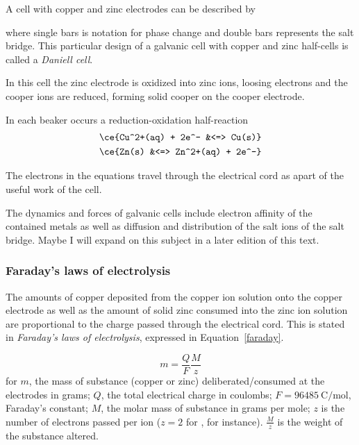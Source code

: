 \documentclass[../mit-general-chemistry.tex]{subfiles}
\begin{document}
A cell with copper and zinc electrodes can be described by


where single bars is notation for phase change and double bars
represents the salt bridge. This particular design of a galvanic cell
with copper and zinc half-cells is called a {\em Daniell cell}.

In this cell the zinc electrode is oxidized into zinc ions, loosing
electrons and the cooper ions are reduced, forming solid cooper on the
cooper electrode.

In each beaker occurs a reduction-oxidation half-reaction
\begin{align*}
  \ce{Cu^2+(aq) + 2e^- &<=> Cu(s)} \\
  \ce{Zn(s) &<=> Zn^2+(aq) + 2e^-} \\
\end{align*}

The electrons in the equations travel through the electrical cord as
apart of the useful work of the cell.

The dynamics and forces of galvanic cells include electron affinity of
the contained metals as well as diffusion and distribution of the
salt ions of the salt bridge. Maybe I will expand on this subject in a
later edition of this text.







\subsubsection{Faraday's laws of electrolysis}

The amounts of copper deposited from the copper ion solution onto the
copper electrode as well as the amount of solid zinc consumed into the
zinc ion solution are proportional to the charge passed through the
electrical cord. This is stated in {\em Faraday's laws of
  electrolysis}, expressed in Equation~\ref{faraday}.

\begin{equation}\label{faraday}
  m = \frac{Q}{F}\frac{M}{z}
\end{equation}
for $m$, the mass of substance (copper or zinc) deliberated/consumed
at the electrodes in grams; $Q$, the total electrical charge in
coulombs; $F = \SI{96485}{\coulomb\per\mol}$, Faraday's constant; $M$,
the molar mass of substance in grams per mole; $z$ is the number of
electrons passed per ion ($z = 2$ for , for
instance). $\frac{M}{z}$ is the weight of the substance altered.
\end{document}
